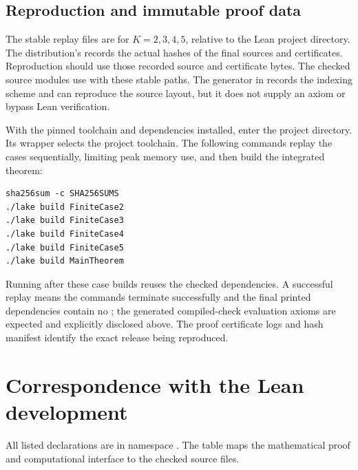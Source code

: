 \documentclass[11pt]{article}
\theoremstyle{definition}
\theoremstyle{remark}
\begin{document}
\subsection{Reproduction and immutable proof data}
The stable replay files are  for
$K=2,3,4,5$, relative to the Lean project directory. The distribution's
 records the actual hashes of the final sources and
certificates. Reproduction should use those recorded source and certificate bytes. The checked source modules use  with
these stable paths. The generator in
 records the
indexing scheme and can reproduce the source layout, but it does not
supply an axiom or bypass Lean verification.

With the pinned toolchain and dependencies installed, enter the
 project directory. Its  wrapper selects
the project toolchain. The following commands replay the cases
sequentially, limiting peak memory use, and then build the integrated
theorem:
\begin{verbatim}
sha256sum -c SHA256SUMS
./lake build FiniteCase2
./lake build FiniteCase3
./lake build FiniteCase4
./lake build FiniteCase5
./lake build MainTheorem
\end{verbatim}
Running  after these case builds reuses
the checked dependencies. A successful replay means the commands
terminate successfully and the final printed dependencies contain no
; the generated compiled-check evaluation axioms are
expected and explicitly disclosed above. The proof certificate logs
and hash manifest identify the exact release being reproduced.

\appendix
\section{Correspondence with the Lean development}
\label{app:correspondence}

All listed declarations are in namespace . The table
maps the mathematical proof and computational interface to the checked
source files.
\end{document}
